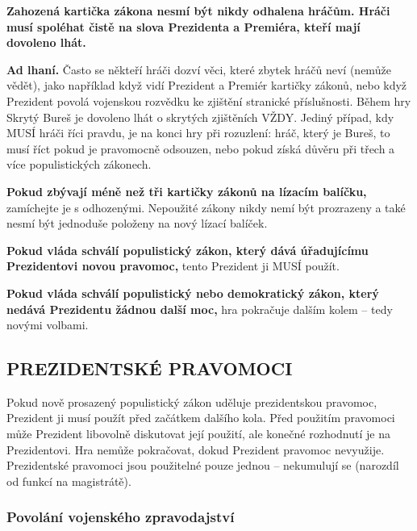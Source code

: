 \documentclass{article}
\newenvironment{redbox}{
    \color{red}\it
}
{
    \normalsize
}
\begin{document}
        \textbf{Zahozená kartička zákona nesmí být nikdy odhalena hráčům. Hráči musí spo\-lé\-hat čistě na slova Prezidenta a Premiéra, kteří mají dovoleno lhát.}

        \begin{redbox}
            \textbf{Ad lhaní.} Často se někteří hráči dozví věci, které zbytek hráčů neví (nemůže vědět), jako například když vidí Prezident a Premiér kartičky zákonů, nebo když Prezident povolá vojenskou rozvědku ke zjištění stranické příslušnosti. Během hry Skrytý Bureš je dovoleno lhát o skrytých zjištěních VŽDY. Jediný případ, kdy MUSÍ hráči říci pravdu, je na konci hry při rozuzlení: hráč, který je Bureš, to musí říct pokud je pravomocně odsouzen, nebo pokud získá důvěru při třech a více populistických zákonech.
        \end{redbox}

        \textbf{Pokud zbývají méně než tři kartičky zákonů na lízacím balíčku,} zamíchejte je s odhozenými. Nepoužité zákony nikdy nemí být prozrazeny a také nesmí být jednoduše položeny na nový lízací balíček.

        \textbf{Pokud vláda schválí populistický zákon, který dává úřadujícímu Prezidentovi novou pravomoc,} tento Prezident ji MUSÍ použít.

        \textbf{Pokud vláda schválí populistický nebo demokratický zákon, který nedává Prezidentu žádnou další moc,} hra pokračuje dalším kolem -- tedy novými volbami.

    \subsection*{PREZIDENTSKÉ PRAVOMOCI} %

        Pokud nově prosazený populistický zákon uděluje prezidentskou pravomoc, Prezident ji musí použít před začátkem dalšího kola. Před použitím pravomoci může Prezident libovolně diskutovat její použití, ale konečné rozhodnutí je na Prezidentovi. Hra nemůže pokračovat, dokud Prezident pravomoc nevyužije. Prezidentské pravomoci jsou použitelné pouze jednou -- nekumulují se (narozdíl od funkcí na magistrátě).


        \subsubsection*{Povolání vojenského zpravodajství} %
\end{document}
